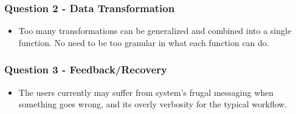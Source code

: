 \documentclass[12pt,letterpaper]{article}
\begin{document}
\subsubsection*{Question 2 - Data Transformation}
\begin{itemize}
    \item Too many transformations can be generalized and combined into a single function. No need to be too granular in what each function can do.  
\end{itemize}

\subsubsection*{Question 3 - Feedback/Recovery}
\begin{itemize}
    \item The users currently may suffer from system's frugal messaging when something goes wrong, and its overly verbosity for the typical workflow.
\end{itemize}
\end{document}
